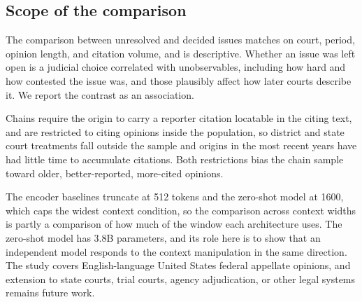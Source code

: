 \subsection*{Scope of the comparison} The comparison between unresolved and
decided issues matches on court, period, opinion length, and citation volume, and
is descriptive. Whether an issue was left open is a judicial choice correlated
with unobservables, including how hard and how contested the issue was, and those
plausibly affect how later courts describe it. We report the contrast as an
association.

Chains require the origin to carry a reporter citation locatable in the citing
text, and are restricted to citing opinions inside the population, so district
and state court treatments fall outside the sample and origins in the most recent
years have had little time to accumulate citations. Both restrictions bias the
chain sample toward older, better-reported, more-cited opinions.

The encoder baselines truncate at 512 tokens and the zero-shot model at 1600,
which caps the widest context condition, so the comparison across context widths
is partly a comparison of how much of the window each architecture uses. The
zero-shot model has 3.8B parameters, and its role here is to show that an
independent model responds to the context manipulation in the same direction. The
study covers English-language United States federal appellate opinions, and
extension to state courts, trial courts, agency adjudication, or other legal
systems remains future work.
